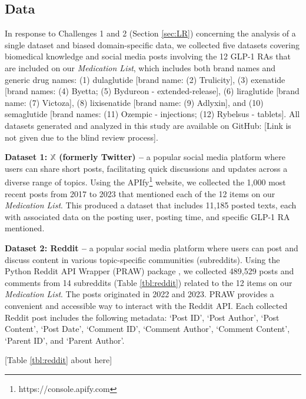 \documentclass[referee,bst/sn-basic]{sn-jnl}%
\theoremstyle{thmstyletwo}%
\theoremstyle{thmstylethree}%
\begin{document}
\subsection{Data}
\label{sect:data}
In response to Challenges 1 and 2 (Section \ref{sec:LR}) concerning the analysis of a single dataset and biased domain-specific data, we collected five datasets covering biomedical knowledge and social media posts involving the 12 GLP-1 RAs that are included on our  \textit{Medication List}, which includes both brand names and generic drug names:
    (1) dulaglutide [brand name: (2) Trulicity],
    (3) exenatide [brand names: (4) Byetta; (5) Bydureon - extended-release],
    (6) liraglutide [brand name: (7) Victoza], 
    (8) lixisenatide [brand name: (9) Adlyxin], and
   (10) semaglutide [brand names: (11) Ozempic - injections; (12) Rybelsus - tablets].
All datasets generated and analyzed in this study are available on GitHub: [Link is not given due to the blind review process]. %

\textbf{Dataset 1: $\mathbb{X}$ (formerly Twitter) --}
a popular social media platform where users can share short posts, facilitating quick discussions and updates across a diverse range of topics.
Using the APIfy\footnote{https://console.apify.com} website, we collected the 1,000 most recent posts from 2017 to 2023 that mentioned each of the 12 items on our \textit{Medication List}.
This produced a dataset that includes 11,185 posted texts, %
each with associated data on the posting user, posting time, and specific GLP-1 RA mentioned.

\textbf{Dataset 2: Reddit --}
a popular social media platform where users can post and discuss content in various topic-specific communities (subreddits).
Using the Python Reddit API Wrapper (PRAW) package \cite{boe2023praw}, 
we collected 489,529 posts and comments from 14 subreddits (Table \ref{tbl:reddit}) related to the 12 items on our \textit{Medication List}.
The posts originated in 2022 and 2023.
PRAW provides a convenient and accessible way to interact with the Reddit API.
Each collected Reddit post includes the following metadata:
    `Post ID',
    `Post Author',
    `Post Content',
    `Post Date',
    `Comment ID',
    `Comment Author',
    `Comment Content',
    `Parent ID', and
    `Parent Author'.

\begin{center}
[Table \ref{tbl:reddit} about here] 
\end{center}
\end{document}
